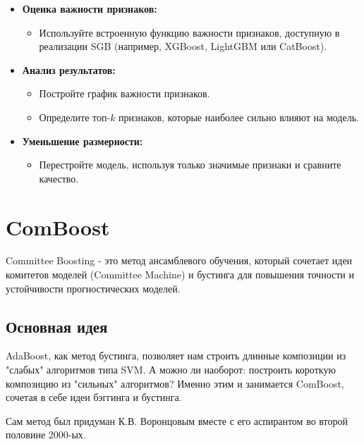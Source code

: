 \begin{itemize}
    \item \textbf{Оценка важности признаков:}
    \begin{itemize}
        \item Используйте встроенную функцию важности признаков, доступную в реализации SGB (например, XGBoost, LightGBM или CatBoost).
    \end{itemize}
    \item \textbf{Анализ результатов:}
    \begin{itemize}
        \item Постройте график важности признаков.
        \item Определите топ-$k$ признаков, которые наиболее сильно влияют на модель.
    \end{itemize}
    \item \textbf{Уменьшение размерности:}
    \begin{itemize}
        \item Перестройте модель, используя только значимые признаки и сравните качество.
    \end{itemize}
\end{itemize}


\section{ComBoost}

Committee Boosting -  это метод ансамблевого обучения, который сочетает идеи комитетов моделей (Committee Machine) и бустинга для повышения точности и устойчивости прогностических моделей.
    
\subsection{Основная идея}
    
AdaBoost, как метод бустинга, позволяет нам строить длинные композиции из "слабых" алгоритмов типа SVM. А можно ли наоборот: построить короткую композицию из "сильных" алгоритмов? Именно этим и занимается ComBoost, сочетая в себе идеи бэггинга и бустинга.
    
Сам метод был придуман К.В. Воронцовым вместе с его аспирантом во второй половине 2000-ых.
    
